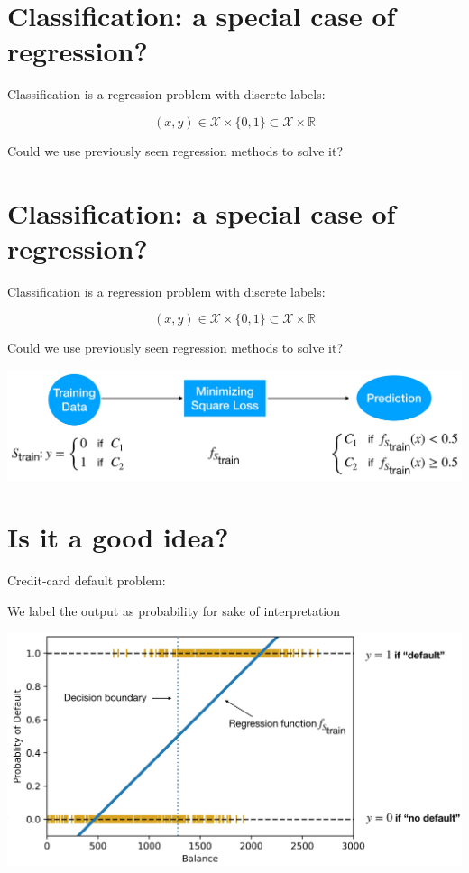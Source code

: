 \documentclass[10pt]{article}
\begin{document}
\section*{Classification: a special case of regression?}
Classification is a regression problem with discrete labels:

$$
(x, y) \in \mathscr{X} \times\{0,1\} \subset \mathscr{X} \times \mathbb{R}
$$

Could we use previously seen regression methods to solve it?

\section*{Classification: a special case of regression?}
Classification is a regression problem with discrete labels:

$$
(x, y) \in \mathscr{X} \times\{0,1\} \subset \mathscr{X} \times \mathbb{R}
$$

Could we use previously seen regression methods to solve it?

\begin{center}
\includegraphics[max width=\textwidth]{2023_12_30_cf784c471dfd1dd5afbag-11}
\end{center}

\section*{Is it a good idea?}
Credit-card default problem:

We label the output as probability for sake of interpretation

\begin{center}
\includegraphics[max width=\textwidth]{2023_12_30_cf784c471dfd1dd5afbag-12}
\end{center}
\end{document}

